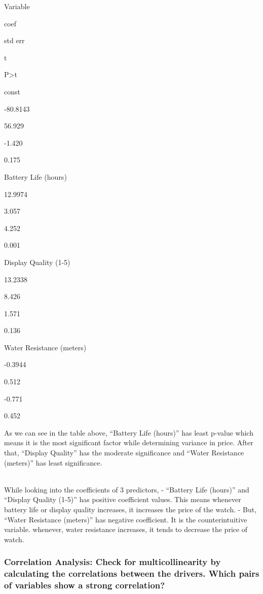 \documentclass[11pt]{article}
\begin{document}
Variable

coef

std err

t

P\textgreater\textbar t\textbar{}

const

-80.8143

56.929

-1.420

0.175

Battery Life (hours)

12.9974

3.057

4.252

0.001

Display Quality (1-5)

13.2338

8.426

1.571

0.136

Water Resistance (meters)

-0.3944

0.512

-0.771

0.452

As we can see in the table above, ``Battery Life (hours)'' has least
p-value which means it is the most significant factor while determining
variance in price. After that, ``Display Quality'' has the moderate
significance and ``Water Resistance (meters)'' has least significance.\\
\strut \\
While looking into the coefficients of 3 predictors, - ``Battery Life
(hours)'' and ``Display Quality (1-5)'' has positive coefficient values.
This means whenever battery life or display quality increases, it
increases the price of the watch. - But, ``Water Resistance (meters)''
has negative coefficient. It is the counterintuitive variable. whenever,
water resistance increases, it tends to decrease the price of watch.

    \hypertarget{correlation-analysis-check-for-multicollinearity-by-calculating-the-correlations-between-the-drivers.-which-pairs-of-variables-show-a-strong-correlation}{%
\subsubsection{Correlation Analysis: Check for multicollinearity by
calculating the correlations between the drivers. Which pairs of
variables show a strong
correlation?}\label{correlation-analysis-check-for-multicollinearity-by-calculating-the-correlations-between-the-drivers.-which-pairs-of-variables-show-a-strong-correlation}}
\end{document}
